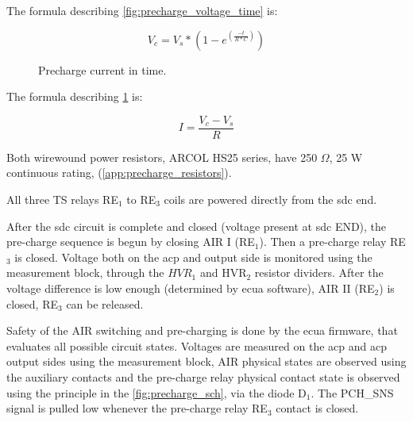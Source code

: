 The formula describing \ref{fig:precharge_voltage_time} is:

\begin{equation}
	V_{c}=V_{s}*(1-e^{(\frac{-t}{R*C})})
	\label{eq:precharge_voltage}
\end{equation}

\begin{figure}
	\caption{Precharge current in time.}
	\label{fig:precharge_current_time}
\end{figure}

The formula describing \ref{fig:precharge_current_time} is:

\begin{equation}
	I=\frac{V_{c}-V_{s}}{R}	
	\label{eq:precharge_current}
\end{equation}


Both wirewound power resistors, ARCOL HS25 series, have 250 $\Omega$, 25 W continuous rating, (\ref{app:precharge_resistors}).

All three TS relays RE$_1$ to RE$_3$ coils are powered directly from the \gls{sdc} end.

After the \gls{sdc} circuit is complete and closed (voltage present at \gls{sdc} END), the pre-charge sequence is begun by closing AIR I (RE$_1$). Then a pre-charge relay RE$_3$ is closed. Voltage both on the \gls{acp} and output side is monitored using the measurement block, through the $HVR_1$ and HVR$_2$ resistor dividers. After the voltage difference is low enough (determined by \gls{ecua} software), AIR II (RE$_2$) is closed, RE$_3$ can be released.

Safety of the AIR switching and pre-charging is done by the \gls{ecua} firmware, that evaluates all possible circuit states. Voltages are measured on the \gls{acp} and \gls{acp} output sides using the measurement block, AIR physical states are observed using the auxiliary contacts and the pre-charge relay physical contact state is observed using the principle in the \ref{fig:precharge_sch}, via the diode D$_1$. The PCH\_SNS signal is pulled low whenever the pre-charge relay RE$_3$ contact is closed.

